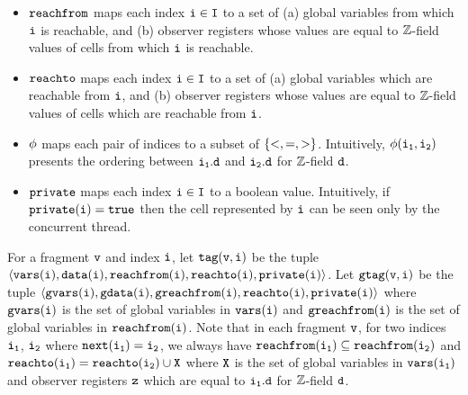 \begin{itemize}
 \item
  ${\tt reachfrom}$ maps each index $\tt i \in {\tt I}$ to a set of (a) global variables from which $\tt i$ is reachable, and
  (b) observer registers whose values are equal to ${\mathbb Z}$-field values of cells from which $\tt i$ is reachable.
\item  ${\tt reachto}$ maps each index $\tt i \in {\tt I}$ to a set of
  (a) global variables which are reachable from $\tt i$, and
  (b) observer registers whose values are equal to ${\mathbb Z}$-field values of cells which are reachable from $\tt i$.
 \item $\tt \phi$ maps each pair of indices to a subset of $\left\{<, =, >\right\}$. Intuitively, $\tt \phi(i_1, i_2)$ presents the ordering between $\tt i_1.d$ and $\tt i_2.d$ for  ${\mathbb Z}$-field $\tt d$.
  \item $\tt private$ maps each index $\tt i \in {\tt I}$ to a boolean value. Intuitively, if $\tt private(i) = true$ then the cell represented by $\tt i$ can be seen only by the concurrent thread.
 
  \end{itemize}
For a fragment $\tt v$ and index $\tt i$, let $\tt tag(v,i)$ be the tuple $\tt \left\langle\tt vars(i), data(i),{\tt reachfrom}(\tt i), {\tt reachto}(\tt i), private(i )\right\rangle$. Let $\tt gtag(v,i)$ be the tuple $\tt \left\langle\tt gvars(i), gdata(i),{\tt greachfrom}(\tt i), {\tt reachto}(\tt i), private(i )\right\rangle$ where $\tt gvars(i)$ is the set of global variables in $\tt vars(i)$ and $\tt greachfrom(i)$ is the set of global variables in $\tt reachfrom(i)$. Note that in each fragment $\tt v$, for two indices $\tt i_1$, $\tt i_2$ where $\tt next(i_1) = i_2$, we always have $\tt {\tt reachfrom}(\tt i_1) \subseteq \tt {\tt reachfrom}(\tt i_2)$ and $\tt {\tt reachto}(\tt i_1) = \tt {\tt reachto}(\tt i_2) \cup X$ where $\tt X$ is the set of global variables in ${\tt vars}(\tt i_1)$ and observer registers $\tt z$ which are equal to $\tt i_1.d$ for ${\mathbb Z}$-field $\tt d$. 
%

